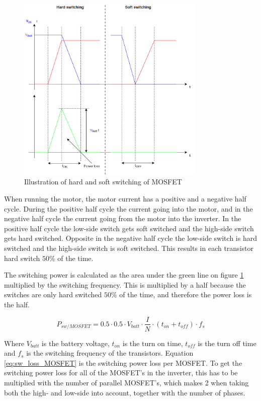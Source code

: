     \begin{figure}[H]
		\centering
		\includegraphics[width=0.8\textwidth]{pictures/hardware/Power_Board/Hard_soft_switching.PNG}
		\caption{Illustration of hard and soft switching of MOSFET}
		\label{fig:HardSoftSwitch}
	\end{figure} 

When running the motor, the motor current has a positive and a negative half cycle. During the positive half cycle the current going into the motor, and in the negative half cycle the current going from the motor into the inverter. In the positive half cycle the low-side switch gets soft switched and the high-side switch gets hard switched. Opposite in the negative half cycle the low-side switch is hard switched and the high-side switch is soft switched. This results in each transistor hard switch $50 \%$ of the time.

The switching power is calculated as the area under the green line on figure \ref{fig:HardSoftSwitch} multiplied by the switching frequency. This is multiplied by a half because the switches are only hard switched $50 \%$ of the time, and therefore the power loss is the half. 

    \begin{equation}
        P_{sw/MOSFET} = 0.5 \cdot 0.5 \cdot V_{batt} \cdot \frac{I}{N} \cdot (t_{on}+t_{off}) \cdot f_{s}
        \label{eq:sw_loss_MOSFET}
    \end{equation}

Where $V_{batt}$ is the battery voltage, $t_{on}$ is the turn on time, $t_{off}$ is the turn off time and $f_{s}$ is the switching frequency of the transistors.
Equation \ref{eq:sw_loss_MOSFET} is the switching power loss per MOSFET. To get the switching power loss for all of the MOSFET's in the inverter, this has to be multiplied with the number of parallel MOSFET's, which makes 2 when taking both the high- and low-side into account, together with the number of phases.

